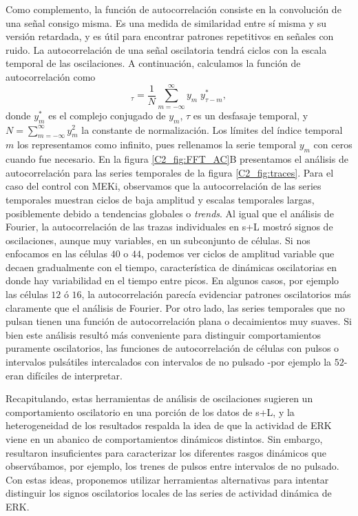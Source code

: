\documentclass[./main.tex]{subfiles}
\begin{document}
Como complemento, la función de autocorrelación consiste en la convolución de una señal consigo misma. Es una medida de similaridad entre sí misma y su versión retardada, y es útil para encontrar patrones repetitivos en señales con ruido. La autocorrelación de una señal oscilatoria tendrá ciclos con la escala temporal de las oscilaciones. A continuación, calculamos la función de autocorrelación como \cite{Harris2020} 
\begin{equation}
    [y \cdot y]_\tau = \frac{1}{N} \sum_{m = -\infty}^{\infty} y_m \; y^*_{\tau - m},
\end{equation}
donde $y^*_m$ es el complejo conjugado de $y_m$, $\tau$ es un desfasaje temporal, y $N = \sum_{m = - \infty}^{\infty} y_m^2$ la constante de normalización. Los límites del índice temporal $m$ los representamos como infinito, pues rellenamos la serie temporal $y_m$ con ceros cuando fue necesario. En la figura \ref{C2_fig:FFT_AC}B presentamos el análisis de autocorrelación para las series temporales de la figura \ref{C2_fig:traces}. Para el caso del control con MEKi, observamos que la autocorrelación de las series temporales muestran ciclos de baja amplitud y escalas temporales largas, posiblemente debido a tendencias globales o \textit{trends}. Al igual que el análisis de Fourier, la autocorrelación de las trazas individuales en s+L mostró signos de oscilaciones, aunque muy variables, en un subconjunto de células. Si nos enfocamos en las células $40$ o $44$, podemos ver ciclos de amplitud variable que decaen gradualmente con el tiempo, característica de dinámicas oscilatorias en donde hay variabilidad en el tiempo entre picos. En algunos casos, por ejemplo las células $12$ ó $16$, la autocorrelación parecía evidenciar patrones oscilatorios más claramente que el análisis de Fourier. Por otro lado, las series temporales que no pulsan tienen una función de autocorrelación plana o decaimientos muy suaves. Si bien este análisis resultó más conveniente para distinguir comportamientos puramente oscilatorios, las funciones de autocorrelación de células con pulsos o intervalos pulsátiles intercalados con intervalos de no pulsado -por ejemplo la $52$- eran difíciles de interpretar.



Recapitulando, estas herramientas de análisis de oscilaciones sugieren un comportamiento oscilatorio en una porción de los datos de s+L, y la heterogeneidad de los resultados respalda la idea de que la actividad de ERK viene en un abanico de comportamientos dinámicos distintos. Sin embargo, resultaron insuficientes para caracterizar los diferentes rasgos dinámicos que observábamos, por ejemplo, los trenes de pulsos entre intervalos de no pulsado. Con estas ideas, proponemos utilizar herramientas alternativas para intentar distinguir los signos oscilatorios locales de las series de actividad dinámica de ERK. 
\end{document}
